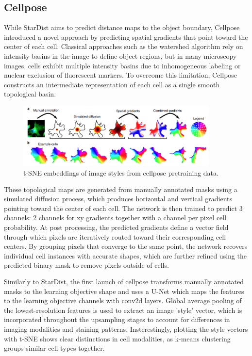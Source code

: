 \subsection{Cellpose}

While StarDist aims to predict distance maps to the object boundary, Cellpose introduced a novel approach by predicting spatial gradients that point toward the center of each cell. Classical approaches such as the watershed algorithm rely on intensity basins in the image to define object regions, but in many microscopy images, cells exhibit multiple intensity basins due to inhomogeneous labeling or nuclear exclusion of fluorescent markers. To overcome this limitation, Cellpose constructs an intermediate representation of each cell as a single smooth topological basin.

\begin{figure}[!ht]
    \centering
    \includegraphics[width=0.9\textwidth]{Images/SOTA/cellpose_learning_objective.png}
    \caption{t-SNE embeddings of image styles from cellpose pretraining data.}
    \label{fig:cellpose_learning_objective}
\end{figure}

These topological maps are generated from manually annotated masks using a simulated diffusion process, which produces horizontal and vertical gradients pointing toward the center of each cell. The network is then trained to predict 3 channels: 2 channels for xy gradients together with a channel per pixel cell probability. At post processing, the predicted gradients define a vector field through which pixels are iteratively routed toward their corresponding cell centers. By grouping pixels that converge to the same point, the network recovers individual cell instances with accurate shapes, which are further refined using the predicted binary mask to remove pixels outside of cells.

Similarly to StarDist, the first launch of cellpose transforms manually annotated masks to the learning objective shape and uses a U-Net which maps the features to the learning objective channels with conv2d layers. Global average pooling of the lowest-resolution features is used to extract an image 'style' vector, which is incorporated throughout the upsampling stages to account for differences in imaging modalities and staining patterns. Insterestingly, plotting the style vectors with t-SNE shows clear distinctions in cell modalities, as k-means clustering groups similar cell types together.

